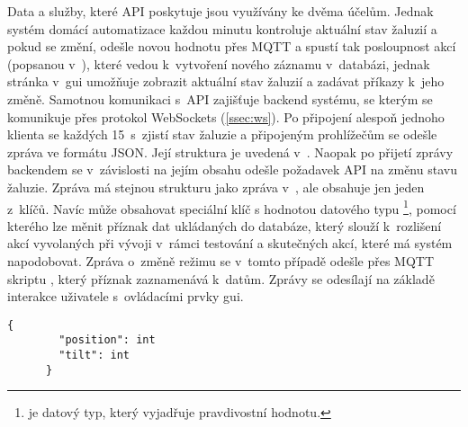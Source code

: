     Data a služby, které API poskytuje jsou využívány ke dvěma účelům. Jednak systém domácí automatizace každou minutu kontroluje aktuální stav žaluzií a pokud se změní, odešle novou hodnotu přes MQTT a spustí tak posloupnost akcí (popsanou v~), které vedou k~vytvoření nového záznamu v~databázi, jednak stránka  v~\acrshort{gui} umožňuje zobrazit aktuální stav žaluzií a zadávat příkazy k~jeho změně. Samotnou komunikaci s~API zajišťuje backend systému, se kterým se komunikuje přes protokol WebSockets (\cref{ssec:ws}). Po připojení alespoň jednoho klienta se každých 15~s~zjistí stav žaluzie a připojeným prohlížečům se odešle zpráva ve formátu JSON. Její struktura je uvedená v~. Naopak po přijetí zprávy backendem se v~závislosti na jejím obsahu odešle požadavek API na změnu stavu žaluzie. Zpráva má stejnou strukturu jako zpráva v~, ale obsahuje jen jeden z~klíčů. Navíc může obsahovat speciální klíč  s hodnotou datového typu \footnote{ je datový typ, který vyjadřuje pravdivostní hodnotu.}, pomocí kterého lze měnit příznak  dat ukládaných do databáze, který slouží k~rozlišení akcí vyvolaných při vývoji v~rámci testování a skutečných akcí, které má systém napodobovat. Zpráva o~změně režimu se v~tomto případě odešle přes MQTT skriptu , který příznak zaznamenává k~datům. Zprávy se odesílají na základě interakce uživatele s~ovládacími prvky \acrshort{gui}.

    \begin{lstlisting}[caption={[Struktura zprávy o~stavu žaluzie]Struktura zprávy o~stavu žaluzie, která je všem klientům zasílána každých 15~s. \code{position} označuje výšku vytažení žaluzie (0 -- zavřeno, 100 -- otevřeno), obdobně hodnota \code{tilt} vyjadřuje naklopení lamel.},captionpos=b,label=lst:wsMsg]
      {
        "position": int
        "tilt": int
      }
    \end{lstlisting}

